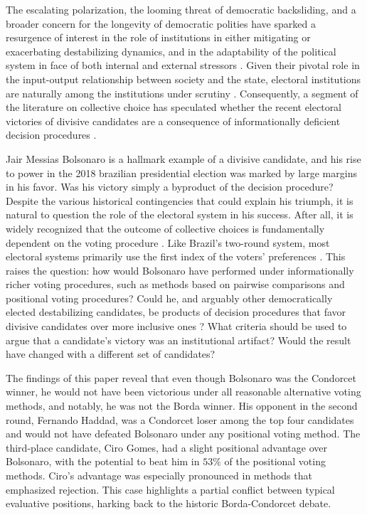 \documentclass[hidelinks,11pt]{article} \usepackage[utf8]{inputenc}
\begin{document}
The escalating polarization, the looming threat of democratic backsliding, and a
broader concern for the longevity of democratic polities have sparked a
resurgence of interest in the role of institutions in either mitigating or
exacerbating destabilizing dynamics, and in the adaptability of the political
system in face of both internal and external stressors
\parencite{Bednare2113843118, chiopris2021wolf, ostrom1997meaning}. Given their
pivotal role in the input-output relationship between society and the state,
electoral institutions are naturally among the institutions under scrutiny
\parencite{Wange2021systems}. Consequently, a segment of the literature on
collective choice has speculated whether the recent electoral victories of
divisive candidates are a consequence of informationally deficient decision
procedures \parencite{potthoff2021condorcet, kurrild2018trump, woon2020trump}.

Jair Messias Bolsonaro is a hallmark example of a divisive candidate, and his
rise to power in the 2018 brazilian presidential election was marked by large
margins in his favor. Was his victory simply a byproduct of the decision
procedure? Despite the various historical contingencies that could explain his
triumph, it is natural to question the role of the electoral system in his
success. After all, it is widely recognized that the outcome of collective
choices is fundamentally dependent on the voting procedure
\parencite{riker1982liberalism}. Like Brazil's two-round system, most electoral
systems primarily use the first index of the voters' preferences
\parencite{grofman04_if_you_like_alter_vote}. This raises the question: how
would Bolsonaro have performed under informationally richer voting procedures,
such as methods based on pairwise comparisons and positional voting procedures?
Could he, and arguably other democratically elected destabilizing candidates, be
products of decision procedures that favor divisive candidates over more
inclusive ones \parencite{igersheim22_compar_votin_method}? What criteria should
be used to argue that a candidate's victory was an institutional artifact? Would
the result have changed with a different set of candidates?

The findings of this paper reveal that even though Bolsonaro was the Condorcet
winner, he would not have been victorious under all reasonable alternative
voting methods, and notably, he was not the Borda winner. His opponent in the
second round, Fernando Haddad, was a Condorcet loser among the top four
candidates and would not have defeated Bolsonaro under any positional voting
method. The third-place candidate, Ciro Gomes, had a slight positional advantage
over Bolsonaro, with the potential to beat him in \(53\%\) of the positional
voting methods. Ciro's advantage was especially pronounced in methods that
emphasized rejection. This case highlights a partial conflict between typical
evaluative positions, harking back to the historic Borda-Condorcet debate.
\end{document}
